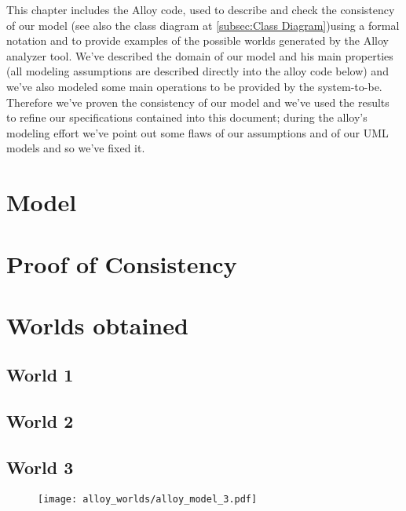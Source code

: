 This chapter includes the Alloy code, used to describe and check the consistency of our model (see also the class diagram at \ref{subsec:Class Diagram})using a formal notation and to provide examples of the possible worlds generated by the Alloy analyzer tool.
\newline
We've described the domain of our model and his main properties (all modeling assumptions are described directly into the alloy code below) and we've also modeled some main operations to be provided by the system-to-be.
Therefore we've proven the consistency of our model and we've used the results to refine our specifications contained into this document; during the alloy's modeling effort we've point out some flaws of our assumptions and of our UML models and so we've fixed it.
\section{Model}
	

\section{Proof of Consistency}
		\noindent{}
	
\section{Worlds obtained}
	\subsection{World 1}
	\noindent{}
	
	\subsection{World 2}
	\noindent{}
	
	\subsection{World 3}
\begin{figure}
\begin{center}
		\vspace*{-100pt}
		\hspace*{-50pt}
		\texttt{[image: alloy\_worlds/alloy\_model\_3.pdf]}
		\label{class_diagram}
\end{center}
\end{figure}
	
	
